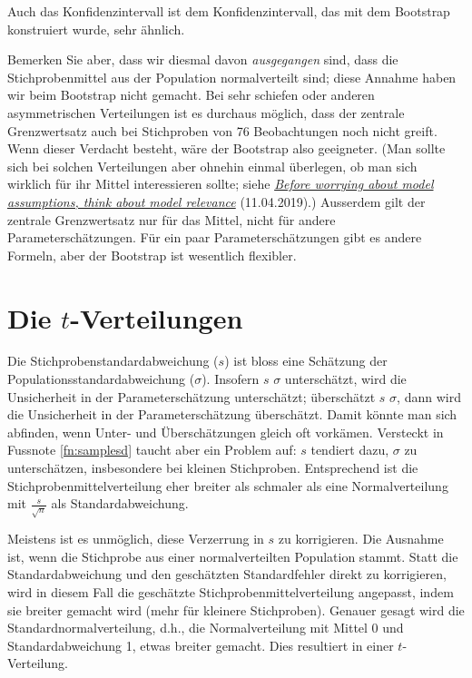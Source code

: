 \documentclass[oneside, 10pt]{book}\usepackage[]{graphicx}\usepackage[]{xcolor}
\begin{document}
Auch das Konfidenzintervall ist dem Konfidenzintervall,
das mit dem Bootstrap konstruiert wurde, sehr ähnlich.

Bemerken Sie aber, dass wir diesmal
davon \emph{ausgegangen} sind, dass die Stichprobenmittel aus
der Population normalverteilt sind; diese Annahme haben
wir beim Bootstrap nicht gemacht. Bei sehr schiefen oder
anderen asymmetrischen Verteilungen ist es durchaus möglich,
dass der zentrale Grenzwertsatz auch bei Stichproben von 76
Beobachtungen noch nicht greift. Wenn dieser Verdacht besteht,
wäre der Bootstrap also geeigneter. (Man sollte sich bei solchen
Verteilungen aber ohnehin einmal überlegen, ob man sich
wirklich für ihr Mittel interessieren sollte; siehe
\href{https://janhove.github.io/analysis/2019/04/11/assumptions-relevance}{\textit{Before worrying about model assumptions, think about model relevance}} (11.04.2019).)
Ausserdem gilt der zentrale Grenzwertsatz nur für das Mittel,
nicht für
andere Parameterschätzungen. Für ein paar Parameterschätzungen
gibt es andere Formeln, aber der Bootstrap ist wesentlich flexibler.

\section{Die $t$-Verteilungen}
Die Stichprobenstandardabweichung ($s$)
ist bloss eine Schätzung der Populationsstandardabweichung ($\sigma$).
Insofern $s$ $\sigma$ unterschätzt, wird die Unsicherheit
in der Parameterschätzung unterschätzt; überschätzt $s$ $\sigma$,
dann wird die Unsicherheit in der Parameterschätzung überschätzt.
Damit könnte man sich abfinden, wenn Unter- und Überschätzungen gleich
oft vorkämen. Versteckt in Fussnote \vref{fn:samplesd} taucht
aber ein Problem auf: $s$ tendiert dazu, $\sigma$ zu unterschätzen,
insbesondere bei kleinen Stichproben.
Entsprechend ist die Stichprobenmittelverteilung eher breiter als
schmaler als eine Normalverteilung mit $\frac{s}{\sqrt{n}}$
als Standardabweichung.

Meistens ist es unmöglich, diese Verzerrung in $s$ zu korrigieren.
Die Ausnahme ist, wenn die Stichprobe
aus einer normalverteilten Population stammt.
Statt die Standardabweichung und den geschätzten Standardfehler
direkt zu korrigieren, wird in diesem Fall
die geschätzte Stichprobenmittelverteilung
angepasst, indem sie breiter gemacht wird
(mehr für kleinere Stichproben).
Genauer gesagt wird die Standardnormalverteilung, d.h.,
die Normalverteilung mit Mittel 0 und Standardabweichung 1,
etwas breiter gemacht.
Dies resultiert in einer $t$-Verteilung.
\end{document}
